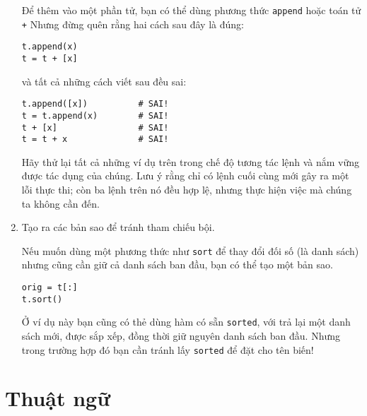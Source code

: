 \documentclass[11pt]{book}
\begin{document}
\begin{enumerate}
Để thêm vào một phần tử, bạn có thể dùng phương thức {\tt append}
hoặc toán tử {\tt +} Nhưng đừng quên rằng hai cách sau đây là đúng:

\beforeverb
\begin{verbatim}
t.append(x)
t = t + [x]
\end{verbatim}
\afterverb

và tất cả những cách viết sau đều sai:

\beforeverb
\begin{verbatim}
t.append([x])          # SAI!
t = t.append(x)        # SAI!
t + [x]                # SAI!
t = t + x              # SAI!
\end{verbatim}
\afterverb

Hãy thử lại tất cả những ví dụ trên trong chế độ tương tác lệnh
và nắm vững được tác dụng của chúng. Lưu ý rằng chỉ có lệnh 
cuối cùng mới gây ra một lỗi thực thi; còn ba lệnh trên nó đều
hợp lệ, nhưng thực hiện việc mà chúng ta không cần đến.


\item Tạo ra các bản sao để tránh tham chiếu bội.


Nếu muốn dùng một phương thức như {\tt sort} để thay đổi
đối số (là danh sách) nhưng cũng cần giữ cả danh sách ban đầu,
bạn có thể tạo một bản sao.

\beforeverb
\begin{verbatim}
orig = t[:]
t.sort()
\end{verbatim}
\afterverb

Ở ví dụ này bạn cũng có thẻ dùng hàm có sẵn {\tt sorted}, với
trả lại một danh sách mới, được sắp xếp, đồng thời giữ nguyên
danh sách ban đầu. Nhưng trong trường hợp đó bạn cần tránh lấy
 {\tt sorted} để đặt cho tên biến!

\end{enumerate}



\section{Thuật ngữ}
\end{document}
